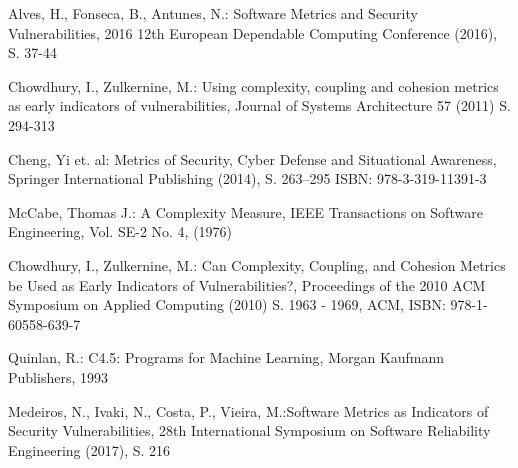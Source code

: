 
\begin{thebibliography}{8}
Alves, H., Fonseca, B., Antunes, N.: Software Metrics and Security Vulnerabilities, 2016 12th European Dependable Computing Conference (2016), S. 37-44

Chowdhury, I., Zulkernine, M.: Using complexity, coupling and cohesion metrics as early indicators of vulnerabilities, Journal of Systems Architecture 57 (2011) S. 294-313

Cheng, Yi et. al: Metrics of Security, Cyber Defense and Situational Awareness, Springer International Publishing (2014), S. 263--295
ISBN: 978-3-319-11391-3

McCabe, Thomas J.: A Complexity Measure, IEEE Transactions on Software Engineering, Vol. SE-2 No. 4, (1976)

Chowdhury, I., Zulkernine, M.: Can Complexity, Coupling, and Cohesion Metrics be Used as Early Indicators of Vulnerabilities?, Proceedings of the 2010 ACM Symposium on Applied Computing (2010) S. 1963 - 1969, ACM, ISBN: 978-1-60558-639-7

Quinlan, R.: C4.5: Programs for Machine Learning, Morgan Kaufmann Publishers, 1993

Medeiros, N., Ivaki, N., Costa, P., Vieira, M.:Software Metrics as Indicators of Security Vulnerabilities, 28th International Symposium on Software Reliability Engineering (2017), S. 216

\end{thebibliography}
